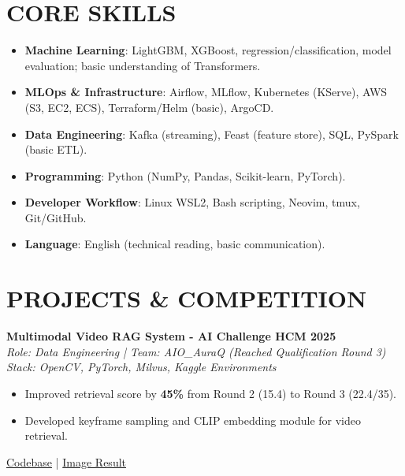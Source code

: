 \documentclass[a4paper,10pt]{extarticle}
\begin{document}
\section*{CORE SKILLS}
\begin{itemize}
  \item \textbf{Machine Learning}: LightGBM, XGBoost, regression/classification, model evaluation; basic understanding of Transformers.
  \item \textbf{MLOps \& Infrastructure}: Airflow, MLflow, Kubernetes (KServe), AWS (S3, EC2, ECS), Terraform/Helm (basic), ArgoCD.
  \item \textbf{Data Engineering}: Kafka (streaming), Feast (feature store), SQL, PySpark (basic ETL).
  \item \textbf{Programming}: Python (NumPy, Pandas, Scikit-learn, PyTorch).
  \item \textbf{Developer Workflow}: Linux WSL2, Bash scripting, Neovim, tmux, Git/GitHub.
  \item \textbf{Language}: English (technical reading, basic communication).
\end{itemize}

\section*{PROJECTS \& COMPETITION}

\textbf{Multimodal Video RAG System - AI Challenge HCM 2025}\\
\textit{Role: Data Engineering | Team: AIO\_AuraQ (Reached Qualification Round 3)}\\
\textit{Stack: OpenCV, PyTorch, Milvus, Kaggle Environments}\\
\begin{itemize}
  \item Improved retrieval score by \textbf{45\%} from Round 2 (15.4) to Round 3 (22.4/35).
  \item Developed keyframe sampling and CLIP embedding module for video retrieval.
\end{itemize}
\faGithub\;\href{https://github.com/dtmhdev89/HCMAI2025_Baseline}{Codebase}
\;|\;
\faChartLine\;\href{https://drive.google.com/drive/folders/1oUb_0HdjAEWWK0tl9sLHoYQfvCMphqZv?hl=vi}{Image Result}

\vspace{4pt}
\end{document}
